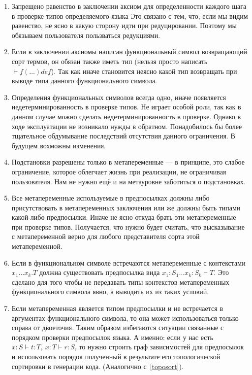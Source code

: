 \begin{enumerate}
\item Запрещено равенство в заключении аксиом для определенности каждого шага в проверке типов определяемого языка Это связано с тем, что, если мы видим равенство, не ясно в какую сторону идти при редуцировании. Поэтому мы обязываем пользователя пользваться редукциями.

\item Если в заключении аксиомы написан функциональный символ возвращающий сорт термов, он обязан также иметь тип (нельзя просто написать $ \vdash f(\ldots) def$). Так как иначе становится неясно какой тип возвращать при выводе типа данного функционального символа.

\item Определения функциональных символов всегда одно, иначе появляется недетерминированность в проверке типов. Не играет особой роли, так как в данном случае можно сделать недетерминированность в проверке. Однако в ходе эксплуатации не возникало нужды в обратном. Понадобилось бы более тщательное обдумывание последствий отсутствия данного ограничения. В будущем вохможны изменения.

\item Подстановки разрешены только в метапеременные --- в принципе, это слабое ограничение, которое облегчает жизнь при реализации, не ограничивая пользователя. Нам не нужно ещё и на метауровне заботиться о подстановках.

\item \label{tm:Meta} Все метапеременные используемые в предпосылках должны либо присутствовать в метапеременных заключения или же должны быть типами какой-либо предпосылки. Иначе не ясно откуда брать эти метапеременные при проверке типов. Получается, что нужно будет считать, что высказывание с метапеременной верно для любого представителя сорта этой метапеременной.

\item Если в функциональном символе встречаются метапеременные с контекстами $x_1 \ldots x_k . T$ должна существовать предпосылка вида $x_1 : S_1 \ldots x_k : S_k  \vdash T$. Это сделано для того чтобы не передавать типы контекстов метапеременных функционального символа явно, а выводить их из таких условий.

\item Если метапеременная является типом предпосылки и не встречается в аргументах функционального символа, то она может использоваться только справа от двоеточия. Таким образом избегаются ситуации связанные с порядком проверки предпосылок языка. А именно: если у нас есть $x : S \vdash t : T,\ x:T \vdash r : S$, то нужно строить граф зависимостей для предпосылок и использовать порядок полученный в результате его топологической сортировки в генерации кода. (Аналогично с~\ref{toposort}).


\end{enumerate}
